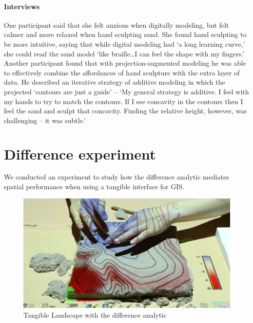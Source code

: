\documentclass[prodmode,acmtochi]{acmsmall} %
\begin{document}
\paragraph{Interviews}
One participant said that she felt anxious when digitally modeling,
but felt calmer and more relaxed when hand sculpting sand. 
%
She found hand sculpting to be more intuitive, saying that
while digital modeling had `a long learning curve,' 
she could read the sand model
`like braille\ldots I can feel the shape with my fingers.'
%
Another participant found that 
with projection-augmented modeling 
he was able to effectively combine 
the affordances of hand sculpture 
with the extra layer of data. 
%
He described an iterative strategy of additive modeling
in which the projected `contours are just a guide' --  
`My general strategy is additive. 
I feel with my hands to try to match the contours. 
If I see concavity in the contours 
then I feel the sand and sculpt that concavity.
Finding the relative height, however, was challenging -- it was subtle.'

\section{Difference experiment}
We conducted an experiment to study 
how the difference analytic mediates spatial performance 
when using a tangible interface for GIS.

\begin{figure}
\begin{center}
		\includegraphics[width=\textwidth]{images/experiments/connie_difference_2.jpg}
	\caption{Tangible Landscape with the difference analytic}
	\label{fig:diff}
\end{center}
\end{figure}
\end{document}
